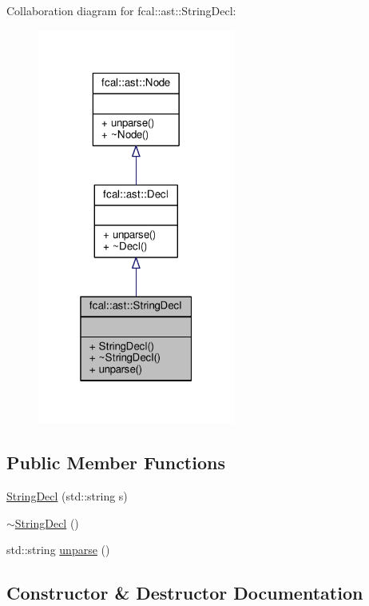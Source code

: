 Collaboration diagram for fcal\+:\+:ast\+:\+:String\+Decl\+:
\nopagebreak
\begin{figure}[H]
\begin{center}
\leavevmode
\includegraphics[width=184pt]{classfcal_1_1ast_1_1StringDecl__coll__graph}
\end{center}
\end{figure}
\subsection*{Public Member Functions}
\begin{DoxyCompactItemize}
\item 
\hyperlink{classfcal_1_1ast_1_1StringDecl_a7cc143024c5fe7c2a0678e13f69b6a5d}{String\+Decl} (std\+::string s)
\item 
\hyperlink{classfcal_1_1ast_1_1StringDecl_a185a5800efcc751ae92b1bf8694aaa5f}{$\sim$\+String\+Decl} ()
\item 
std\+::string \hyperlink{classfcal_1_1ast_1_1StringDecl_a51032ea2eab202f11fb1dc08bd718153}{unparse} ()
\end{DoxyCompactItemize}


\subsection{Constructor \& Destructor Documentation}
